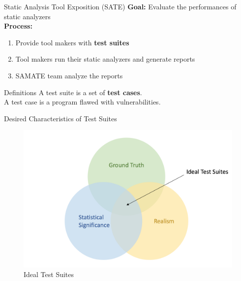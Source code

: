 \documentclass[aspectratio=169]{beamer}
\begin{document}
  \begin{frame}{Static Analysis Tool Exposition (SATE)}
    \textbf{Goal:} \alert{Evaluate the performances of static analyzers}\\
    \pause
    \vfill
    \textbf{Process:}
    \begin{enumerate}
    \item Provide tool makers with \textbf{test suites}
    \item Tool makers run their static analyzers and generate reports
    \item SAMATE team analyze the reports
    \end{enumerate}
    \pause
    \vfill
    \begin{block}{Definitions}
      \vspace{0.3em}
      A \textcolor{mLightGreen}{test suite} is a set of \textbf{test cases}.\\
      \pause
      \vspace{0.3em}
      A \textcolor{mLightGreen}{test case} is a program flawed with vulnerabilities.
    \end{block}
  \end{frame}

  \begin{frame}{Desired Characteristics of Test Suites}
    \begin{figure}
      \centering
      \includegraphics[scale=0.35]{figures/ideal-test-suites}
      \caption{Ideal Test Suites}
    \end{figure}
  \end{frame}
\end{document}
